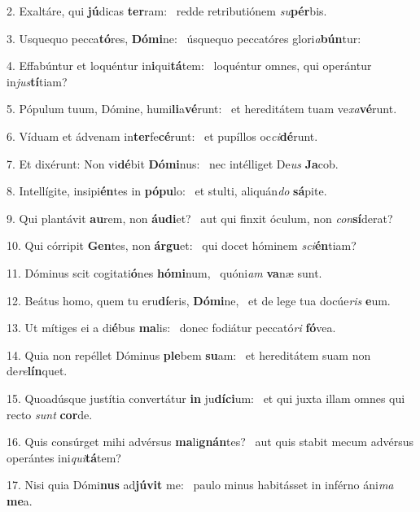 2. Exaltáre, qui \textbf{jú}dicas \textbf{ter}ram: \ast\  redde retributiónem \textit{su}\textbf{pér}bis.\

3. Usquequo pecca\textbf{tó}res, \textbf{Dó}\textbf{mi}ne: \ast\  úsquequo peccatóres glori\textit{a}\textbf{bún}tur:\

4. Effabúntur et loquéntur in\textbf{i}qui\textbf{tá}tem: \ast\  loquéntur omnes, qui operántur in\textit{jus}\textbf{tí}tiam?\

5. Pópulum tuum, Dómine, humi\textbf{li}a\textbf{vé}runt: \ast\  et hereditátem tuam ve\textit{xa}\textbf{vé}runt.\

6. Víduam et ádvenam in\textbf{ter}fe\textbf{cé}runt: \ast\  et pupíllos oc\textit{ci}\textbf{dé}runt.\

7. Et dixérunt: Non vi\textbf{dé}bit \textbf{Dó}\textbf{mi}nus: \ast\  nec intélliget De\textit{us} \textbf{Ja}cob.\

8. Intellígite, insipi\textbf{én}tes in \textbf{pó}\textbf{pu}lo: \ast\  et stulti, aliquán\textit{do} \textbf{sá}pite.\

9. Qui plantávit \textbf{au}rem, non \textbf{áu}\textbf{di}et? \ast\  aut qui finxit óculum, non \textit{con}\textbf{sí}derat?\

10. Qui córripit \textbf{Gen}tes, non \textbf{ár}\textbf{gu}et: \ast\  qui docet hóminem \textit{sci}\textbf{én}tiam?\

11. Dóminus scit cogitati\textbf{ó}nes \textbf{hó}\textbf{mi}num, \ast\  quóni\textit{am} \textbf{va}næ sunt.\

12. Beátus homo, quem tu eru\textbf{dí}eris, \textbf{Dó}\textbf{mi}ne, \ast\  et de lege tua docúe\textit{ris} \textbf{e}um.\

13. Ut mítiges ei a di\textbf{é}bus \textbf{ma}lis: \ast\  donec fodiátur peccató\textit{ri} \textbf{fó}vea.\

14. Quia non repéllet Dóminus \textbf{ple}bem \textbf{su}am: \ast\  et hereditátem suam non de\textit{re}\textbf{lín}quet.\

15. Quoadúsque justítia convertátur \textbf{in} ju\textbf{dí}\textbf{ci}um: \ast\  et qui juxta illam omnes qui recto \textit{sunt} \textbf{cor}de.\

16. Quis consúrget mihi advérsus \textbf{ma}li\textbf{gnán}tes? \ast\  aut quis stabit mecum advérsus operántes ini\textit{qui}\textbf{tá}tem?\

17. Nisi quia Dómi\textbf{nus} ad\textbf{jú}\textbf{vit} me: \ast\  paulo minus habitásset in inférno áni\textit{ma} \textbf{me}a.\

